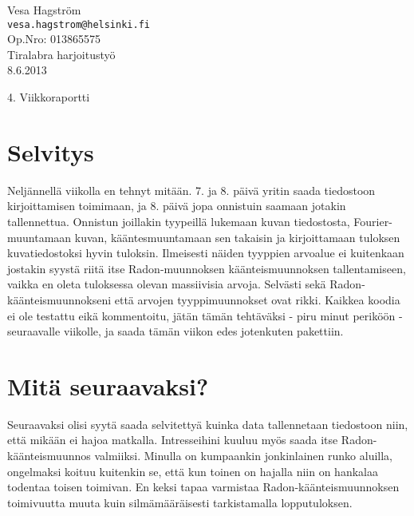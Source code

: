 \documentclass[12pt,a4paper]{report}
\author{Vesa Hagström}
\begin{document}
    \renewcommand{\bibname}{Viitteet}

	\begin{titlepage}
    \label{Title}
	\begin{flushleft}
		\hfill Vesa Hagström 											\\
		\hfill \texttt{vesa.hagstrom@helsinki.fi} 						\\
		\hfill Op.Nro: 013865575											\\
		\hfill Tiralabra harjoitustyö									\\
		\hfill 8.6.2013													\\
	\end{flushleft}

	\vfill

	\begin{center}
		\huge{4. Viikkoraportti}
	\end{center}

	\vfill

	\end{titlepage}

    \section*{Selvitys}
    Neljännellä viikolla en tehnyt mitään. 7. ja 8. päivä yritin saada tiedostoon kirjoittamisen toimimaan, ja 8. päivä jopa onnistuin saamaan jotakin tallennettua. 
    Onnistun joillakin tyypeillä lukemaan kuvan tiedostosta, Fourier-muuntamaan kuvan, kääntesmuuntamaan sen takaisin ja kirjoittamaan tuloksen kuvatiedostoksi hyvin tuloksin. Ilmeisesti näiden tyyppien arvoalue ei kuitenkaan jostakin syystä riitä itse Radon-muunnoksen käänteismuunnoksen tallentamiseen, vaikka en oleta tuloksessa olevan massiivisia arvoja. Selvästi sekä Radon-käänteismuunnokseni että arvojen tyyppimuunnokset ovat rikki. 
    Kaikkea koodia ei ole testattu eikä kommentoitu, jätän tämän tehtäväksi - piru minut periköön - seuraavalle viikolle, ja saada tämän viikon edes jotenkuten pakettiin.  
    
    \section*{Mitä seuraavaksi?}
    Seuraavaksi olisi syytä saada selvitettyä kuinka data tallennetaan tiedostoon niin, että mikään ei hajoa matkalla. Intresseihini kuuluu myös saada itse Radon-käänteismuunnos valmiiksi. Minulla on kumpaankin jonkinlainen runko aluilla, ongelmaksi koituu kuitenkin se, että kun toinen on hajalla niin on hankalaa todentaa toisen toimivan. En keksi tapaa varmistaa Radon-käänteismuunnoksen toimivuutta muuta kuin silmämääräisesti tarkistamalla lopputuloksen.    
     
\end{document}
